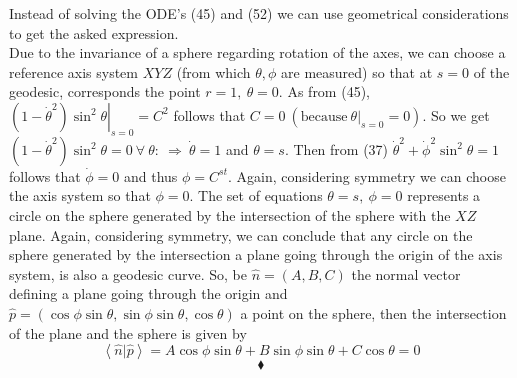 Instead of solving the ODE's (45) and (52) we can use geometrical considerations to get the asked expression.\\ Due to the invariance of a sphere regarding rotation of the axes, we can choose a reference axis system $XYZ$ (from which $\theta, \phi$ are measured) so that at $s=0$ of the geodesic,  corresponds the point $r=1, \ \theta = 0$. As  from (45),  $\left.(1-\dot{\theta}^2)\sin^2\theta \right |_{s=0} = C^2$ follows that $C=0 \ (\text{because} \ \left.\theta \right |_{s=0} = 0)$. So we get $(1-\dot{\theta}^2)\sin^2\theta  = 0 \ \forall \ \theta : \ \Rightarrow \ \dot{\theta} = 1$ and  $\theta =s$. Then from (37) $\dot{\theta}^2+\dot{\phi}^2\sin^2\theta = 1$  follows that $\dot{\phi}= 0$ and thus $\phi = C^{st}$. Again, considering symmetry we can choose the axis system so that $\phi = 0$. The set of equations $ \theta =s, \ \phi = 0$ represents a circle on the sphere generated by the intersection of the sphere with the $XZ$ plane. Again, considering symmetry, we can conclude that any circle on the sphere generated by the intersection a plane going through the origin of the axis system, is also a geodesic curve. So, be $\widehat{n} = (A,B,C)$ the normal vector defining a plane going through the origin and $\widehat{p} = (\cos\phi \sin\theta,\sin\phi \sin\theta,\cos\theta)$ a point on the sphere, then the intersection of the plane and the sphere is given by $$\left<\widehat{n} | \widehat{p}\right> = A\cos\phi \sin\theta+ B\sin\phi \sin\theta+ C\cos\theta = 0$$
$$\blacklozenge$$
\newpage

